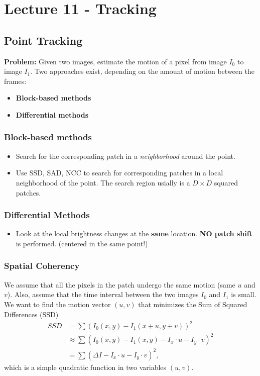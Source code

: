 \documentclass[a4paper,12 pt]{article}
\theoremstyle{definition}
\theoremstyle{remark}
\theoremstyle{definition}
\theoremstyle{definition}
\theoremstyle{definition}
\theoremstyle{remark}
\theoremstyle{definition}
\begin{document}
\section*{Lecture 11 - Tracking}
\subsection*{Point Tracking}
\textbf{Problem:} Given two images, estimate the motion of a pixel from image $I_0$ to image $I_1$. Two approaches exist, depending on the amount of motion between the frames:
\begin{itemize}
\item \textbf{Block-based methods}
\item \textbf{Differential methods}
\end{itemize}
\subsubsection*{Block-based methods}
\begin{itemize}
\item Search for the corresponding patch in a \textit{neighborhood} around the point.
\item Use SSD, SAD, NCC to search for corresponding patches in a local neighborhood of the point. The search region usially is a $D\times D$ squared patches.
\end{itemize}
\subsubsection*{Differential Methods}
\begin{itemize}
\item Look at the local brightness changes at the \textbf{same} location. \textbf{NO patch shift} is performed. (centered in the same point!)
\end{itemize}
\subsubsection*{Spatial Coherency}
We assume that all the pixels in the patch undergo the same motion (same $u$ and $v$). Also, assume that the time interval between the two images $I_0$ and $I_1$ is small. We want to find the motion vector $(u,v)$ that minimizes the Sum of Squared Differences (SSD)
\begin{equation}
\begin{split}
SSD&=\sum(I_0(x,y)-I_1(x+u,y+v))^2 \\
&\approx \sum(I_0(x,y)-I_1(x,y)-I_x\cdot u -I_y \cdot v)^2\\
&=\sum(\Delta I-I_x\cdot u - I_y \cdot v)^2,
\end{split}
\end{equation}
which is a simple quadratic function in two variables $(u,v)$.
\end{document}
